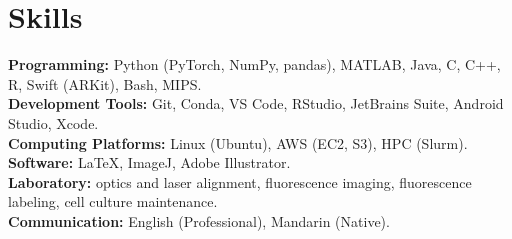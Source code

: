 \documentclass[letterpaper, 11pt]{article}
\newcommand{\subsectionvspace}{\vspace{8pt}}
\begin{document}





\section{Skills}


    \textbf{Programming:} Python (PyTorch, NumPy, pandas), MATLAB, Java, C, C++, R, Swift (ARKit), Bash, MIPS. \\
    \textbf{Development Tools:} Git, Conda, VS Code, RStudio, JetBrains Suite, Android Studio, Xcode. \\
    \textbf{Computing Platforms:} Linux (Ubuntu), AWS (EC2, S3), HPC (Slurm). \\
    \textbf{Software:} LaTeX, ImageJ, Adobe Illustrator. \\
    \textbf{Laboratory:} optics and laser alignment, fluorescence imaging, fluorescence labeling, cell culture maintenance. \\
    \textbf{Communication:} English (Professional), Mandarin (Native).
\end{document}
